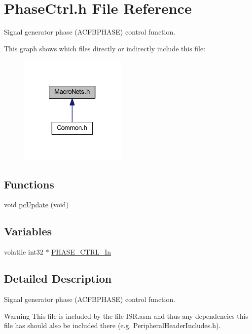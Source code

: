 \hypertarget{a00023}{\section{Phase\-Ctrl.\-h File Reference}
\label{a00023}
}


Signal generator phase (A\-C\-F\-B\-P\-H\-A\-S\-E) control function.  


This graph shows which files directly or indirectly include this file\-:
\nopagebreak
\begin{figure}[H]
\begin{center}
\leavevmode
\includegraphics[width=148pt]{a00050}
\end{center}
\end{figure}
\subsection*{Functions}
\begin{DoxyCompactItemize}
\item 
void \hyperlink{a00023_a2aab767cee769a114c9e2ab25771e447}{pc\-Update} (void)
\end{DoxyCompactItemize}
\subsection*{Variables}
\begin{DoxyCompactItemize}
\item 
volatile int32 $\ast$ \hyperlink{a00023_ac286d0874ebba5141e36971f4a7f106e}{P\-H\-A\-S\-E\-\_\-\-C\-T\-R\-L\-\_\-\-In}
\end{DoxyCompactItemize}


\subsection{Detailed Description}
Signal generator phase (A\-C\-F\-B\-P\-H\-A\-S\-E) control function. \begin{DoxyWarning}{Warning}
This file is included by the file I\-S\-R.\-asm and thus any dependencies this file has should also be included there (e.\-g. Peripheral\-Header\-Includes.\-h). 
\end{DoxyWarning}


